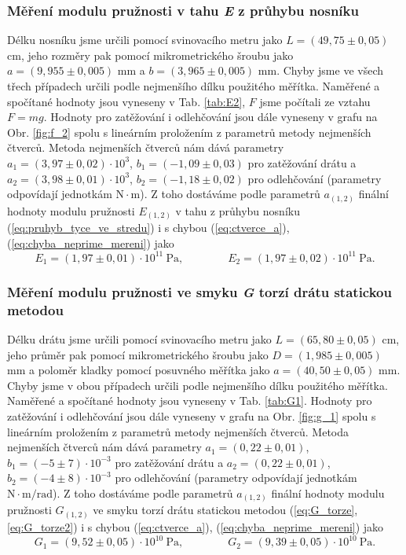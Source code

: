 \documentclass[english]{article}
\newcommand{\unit}[1]{\mathrm{#1}}
\begin{document}
			\subsubsection{Měření modulu pružnosti v tahu \emph{E} z průhybu nosníku}
						Délku nosníku jsme určili pomocí svinovacího metru jako $L = (49,75\pm0,05)$ cm, jeho rozměry pak pomocí mikrometrického šroubu jako $a=(9,955\pm0,005)$ mm a $b=(3,965\pm0,005)$ mm. Chyby jsme ve všech třech případech určili podle nejmenšího dílku použitého měřítka.
						Naměřené a spočítané hodnoty jsou vyneseny v Tab. \ref{tab:E2}, $F$ jsme počítali ze vztahu $F=mg$. Hodnoty pro zatěžování i odlehčování jsou dále vyneseny v grafu na Obr. \ref{fig:f_2} spolu s lineárním proložením z parametrů metody nejmenších čtverců.
						Metoda nejmenších čtverců \cite{bib:ctverce} nám dává parametry $a_1 = (3,97\pm0,02)\cdot 10^{3}$, $b_1 = (-1,09\pm0,03)$ pro zatěžování drátu a $a_2 = (3,98\pm0,01)\cdot 10^{3}$, $b_2 = (-1,18\pm0,02)$ pro odlehčování (parametry odpovídají jednotkám $\unit{N\cdot m}$). Z toho dostáváme podle parametrů $a_{(1,2)}$ finální hodnoty modulu pružnosti $E_{(1,2)}$ v tahu z průhybu nosníku (\ref{eq:pruhyb_tyce_ve_stredu}) i s chybou (\ref{eq:ctverce_a}), (\ref{eq:chyba_neprime_mereni}) jako 
						\begin{equation}
								E_1 = (1,97\pm0,01)       \cdot \unit{10^{11}\ Pa,} \qquad \qquad
								E_2 = (1,97\pm0,02)       \cdot \unit{10^{11}\ Pa.}
						\end{equation}	
						
			\subsubsection{Měření modulu pružnosti ve smyku \emph{G} torzí drátu statickou metodou}
						Délku drátu jsme určili pomocí svinovacího metru jako $L = (65,80\pm0,05)$ cm, jeho průměr pak pomocí mikrometrického šroubu jako $D=(1,985\pm0,005)$ mm a poloměr kladky pomocí posuvného měřítka jako $a=(40,50\pm0,05)$ mm. Chyby jsme v obou případech určili podle nejmenšího dílku použitého měřítka.
						Naměřené a spočítané hodnoty jsou vyneseny v Tab. \ref{tab:G1}. Hodnoty pro zatěžování i odlehčování jsou dále vyneseny v grafu na Obr. \ref{fig:g_1} spolu s lineárním proložením z parametrů metody nejmenších čtverců.
						Metoda nejmenších čtverců \cite{bib:ctverce} nám dává parametry $a_1 = (0,22\pm0,01)$, $b_1 = (-5\pm7) \cdot 10^{-3}$ pro zatěžování drátu a $a_2 = (0,22\pm0,01)$, $b_2 = (-4\pm8)\cdot 10^{-3}$ pro odlehčování (parametry odpovídají jednotkám $\unit{N\cdot m/rad}$). Z toho dostáváme podle parametrů $a_{(1,2)}$ finální hodnoty modulu pružnosti $G_{(1,2)}$ ve smyku torzí drátu statickou metodou (\ref{eq:G_torze}, \ref{eq:G_torze2}) i s chybou (\ref{eq:ctverce_a}), (\ref{eq:chyba_neprime_mereni}) jako 
						\begin{equation}
								G_1 = (9,52\pm0,05)       \cdot \unit{10^{10}\ Pa,} \qquad \qquad
								G_2 = (9,39\pm0,05)       \cdot \unit{10^{10}\ Pa.}
						\end{equation}	
						
\end{document}
